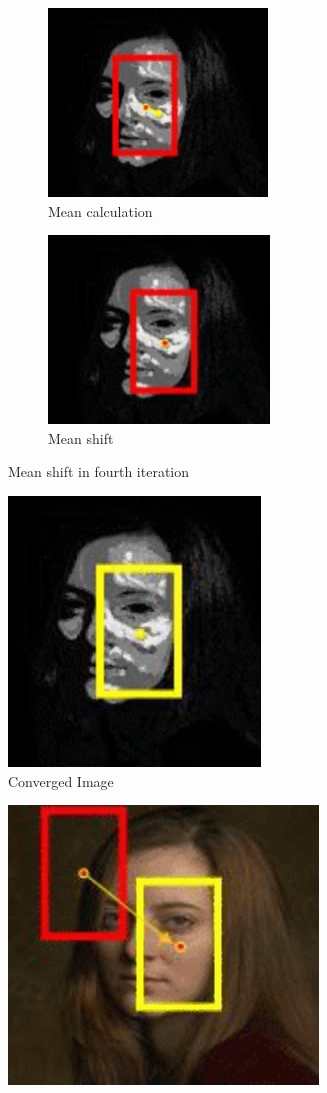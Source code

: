 \documentclass[11pt,a4paper]{article}
\begin{document}
\begin{itemize}
\begin{itemize}
\begin{figure}[h!]
\begin{subfigure}{0.5\textwidth}
\includegraphics[width=0.9\linewidth, height=5cm]{mc4.png} 
\caption{Mean calculation}
\end{subfigure}
\begin{subfigure}{0.5\textwidth}
\includegraphics[width=0.9\linewidth, height=5cm]{ms4.png}
\caption{Mean shift}
\end{subfigure}
 \caption{Mean shift in fourth iteration}
\end{figure}
\begin{figure}[h!]
			\includegraphics[scale=0.7]{convergedimage.png}
			\centering
			\caption{Converged Image}
		\end{figure}
\begin{figure}[h!]
			\includegraphics[scale=0.7]{shiftedwindow.png}

\end{figure}
\end{itemize}
\end{itemize}
\end{document}
